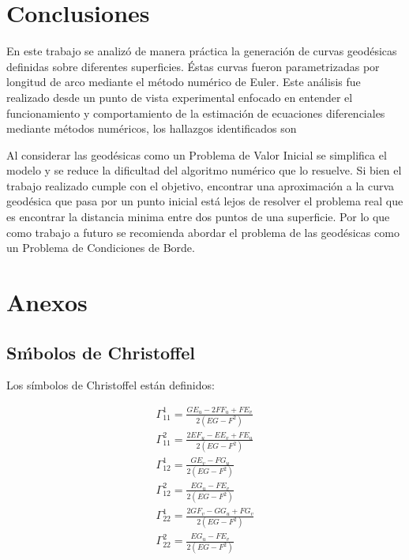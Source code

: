 \documentclass{endm}
\begin{document}
\section{Conclusiones}\label{Conclusiones}


En este trabajo se analiz\'o de manera pr\'actica la generaci\'on de curvas geod\'esicas definidas sobre diferentes superficies. \'Estas curvas fueron parametrizadas por longitud de arco mediante el m\'etodo num\'erico de Euler\cite{notasMN}. Este an\'alisis fue realizado desde un punto de vista experimental enfocado en entender el funcionamiento y comportamiento de la estimaci\'on de ecuaciones diferenciales mediante m\'etodos num\'ericos, los hallazgos identificados son 

Al considerar las geod\'esicas como un Problema de Valor Inicial se simplifica el modelo y se reduce la dificultad del algoritmo num\'erico que lo resuelve. Si bien el trabajo realizado cumple con el objetivo, encontrar una aproximaci\'on a la curva geod\'esica que pasa por un punto inicial est\'a lejos de resolver el problema real que es encontrar la distancia minima entre dos puntos de una superficie.  Por lo que como trabajo a futuro se recomienda abordar el problema de las geod\'esicas como un Problema de Condiciones de Borde.






%


\newpage

\section*{Anexos}
\subsection*{S\'mbolos de Christoffel} \label{simbolosCr}

Los s\'imbolos de Christoffel est\'an definidos:

\begin{align} 
\Gamma_{11}^1 = \frac{GE_u - 2 FF_u + FE_v}{2(EG - F^2)} \label{Gam_11_1}\\
\Gamma_{11}^2 = \frac{2EF_u - EE_v + FE_u}{2(EG - F^2)}\label{Gam_11_2}\\
\Gamma_{12}^1 = \frac{GE_v - FG_u}{2(EG - F^2)} \label{Gam_12_1}\\
\Gamma_{12}^2 = \frac{EG_u - FE_v}{2(EG - F^2)}\label{Gam_12_2}\\
\Gamma_{22}^1 = \frac{2GF_v - GG_u + FG_v}{2(EG - F^2)} \label{Gam_22_1}\\
\Gamma_{22}^2 = \frac{EG_u - FE_v}{2(EG - F^2)}\label{Gam_22_2}
\end{align}
\end{document}
